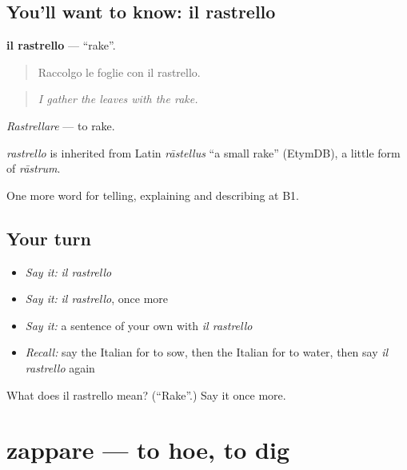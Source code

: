 \subsection*{You'll want to know: il rastrello}
\textbf{il rastrello} — \textquotedblleft{}rake\textquotedblright{}.

\begin{quote}
Raccolgo le foglie con il rastrello.
\end{quote}

\begin{quote}
\emph{I gather the leaves with the rake.}
\end{quote}

\emph{Rastrellare} — to rake.

\begin{cousinweb}
\emph{rastrello} is inherited from Latin \emph{rāstellus} \textquotedblleft{}a small rake\textquotedblright{} (EtymDB), a little form of \emph{rāstrum}.
\end{cousinweb}

\begin{grammarlens}[title={What you've built}]
One more word for telling, explaining and describing at B1.
\end{grammarlens}

\subsection*{Your turn}
\begin{itemize}
\raggedright
  \item \emph{Say it:} \emph{il rastrello}
  \item \emph{Say it:} \emph{il rastrello}, once more
  \item \emph{Say it:} a sentence of your own with \emph{il rastrello}
  \item \emph{Recall:} say the Italian for to sow, then the Italian for to water, then say \emph{il rastrello} again
\end{itemize}

\begin{tcolorbox}[breakable,colback=teal!4,colframe=teal!35!black,title={Before you move on}]
What does il rastrello mean? (\textquotedblleft{}Rake\textquotedblright{}.) Say it once more.
\end{tcolorbox}
\section[zappare]{zappare — to hoe, to dig}

